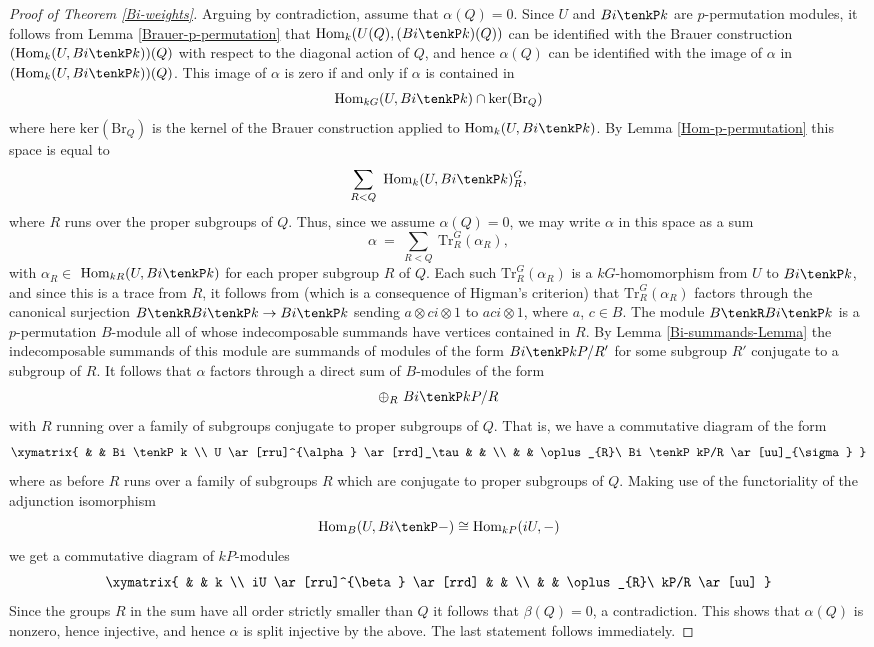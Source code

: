 \documentclass{amsart}
\theoremstyle{plain}\newtheorem{Theorem}{Theorem}[section]
\theoremstyle{plain}\newtheorem{Conjecture}[Theorem]{Conjecture}
\theoremstyle{plain}\newtheorem{Corollary}[Theorem]{Corollary}
\theoremstyle{plain}\newtheorem{Lemma}[Theorem]{Lemma}
\theoremstyle{plain}\newtheorem{Proposition}[Theorem]{Proposition}
\theoremstyle{definition}\newtheorem{Definition}[Theorem]{Definition}
\theoremstyle{definition}\newtheorem{Example}[Theorem]{Example}
\theoremstyle{definition}\newtheorem{Examples}[Theorem]{Examples}
\theoremstyle{definition}\newtheorem{Exercise}[Theorem]{Exercise}
\theoremstyle{definition}\newtheorem{Notation}[Theorem]{Notation}
\theoremstyle{definition}\newtheorem{Remark}[Theorem]{Remark}
\theoremstyle{definition}\newtheorem{Remarks}[Theorem]{Remarks}
\theoremstyle{plain}\newtheorem{Statement}[Theorem]{}
\def\Br{\mathrm{Br}}                 \def\ten{\otimes}
\def\Hom{\mathrm{Hom}}           \def\tenkS{\otimes_{kS}}
\def\ker{\mathrm{ker}}           \def\tenkT{\otimes_{kT}}
\def\Tr{\mathrm{Tr}}             \def\tenOT{\otimes_{\mathcal{O}T}}
\begin{document}
\begin{proof}[Proof of Theorem \ref{Bi-weights}]
Arguing by contradiction, assume that $\alpha(Q)=0$. Since
$U$ and $Bi\tenkP k$ are $p$-permutation modules, it follows from
Lemma \ref{Brauer-p-permutation}
that $\Hom_k(U(Q),(Bi\tenkP k)(Q))$ can be identified with the Brauer
construction  $(\Hom_k(U, Bi\tenkP k))(Q)$ with respect to the diagonal
action of $Q$, and hence $\alpha(Q)$ can be identified with the image
of $\alpha$ in $(\Hom_k(U, Bi\tenkP k))(Q)$. This image of $\alpha$ is zero 
if and only if $\alpha$ is contained in 
$$\Hom_{kG}(U,Bi\tenkP k) \cap \ker(\Br_Q)$$
where here $\ker(\Br_Q)$ is the kernel of the Brauer construction applied to 
$\Hom_k(U, Bi\tenkP k)$.  By Lemma \ref{Hom-p-permutation} this space is
equal to
$$\sum_{R<Q}\ \Hom_k(U,Bi\tenkP k)_R^G,$$
where $R$ runs over the proper subgroups of $Q$. Thus, since we assume
$\alpha(Q)=0$, we may write $\alpha$ in this space as a sum
$$\alpha \ =\ \sum_{R<Q}\ \Tr^G_R(\alpha_R),$$
with $\alpha_R\in$ $\Hom_{kR}(U, Bi\tenkP k)$ for each proper subgroup $R$ of $Q$.
Each such $\Tr^G_R(\alpha_R)$ is a $kG$-homomorphism from $U$ to $Bi\tenkP k$,
and since this is a trace from $R$, it follows from \cite[Corollary 2.6.8]{LiBookI}
(which is a consequence of Higman's criterion) that $\Tr^G_R(\alpha_R)$
factors through the canonical surjection $B\tenkR Bi\tenkP k\to Bi\tenkP k$
sending $a\ten ci \ten 1$ to  $aci\ten 1$, where $a$, $c\in B$. 
The module $B\tenkR Bi\tenkP k$ is
a $p$-permutation $B$-module all of whose indecomposable summands have
vertices contained in $R$.  By  Lemma \ref{Bi-summands-Lemma} the 
indecomposable summands of this module are summands of modules of the 
form $Bi \tenkP kP/R'$ for some subgroup $R'$ conjugate to a subgroup of $R$. 
It follows that $\alpha$ factors through a direct sum of $B$-modules of the form
$$\oplus_{R}\ Bi \tenkP kP/R$$
with $R$ running over a family of subgroups conjugate to proper subgroups
of $Q$. That  is, we have a commutative diagram of the form
$$\xymatrix{ & & Bi \tenkP k \\
U \ar[rru]^{\alpha} \ar[rrd]_\tau & & \\
& & \oplus_{R}\ Bi \tenkP kP/R \ar[uu]_{\sigma} 
}$$
where as before $R$ runs over a family of subgroups $R$ which are conjugate to 
proper subgroups of $Q$. Making use of the functoriality of the adjunction 
isomorphism
$$\Hom_B(U, Bi\tenkP -)\cong \Hom_{kP}(iU, -)$$
we get a commutative diagram of $kP$-modules 
$$\xymatrix{ & & k \\
iU \ar[rru]^{\beta} \ar[rrd] & & \\
& & \oplus_{R}\ kP/R \ar[uu] 
}$$
Since the groups $R$ in the sum have all order strictly smaller than $Q$
it follows that $\beta(Q)=0$, a contradiction. This shows that $\alpha(Q)$
is nonzero, hence injective, and hence $\alpha$ is split injective by the above.
The last statement follows immediately. 
\end{proof}
\end{document}
